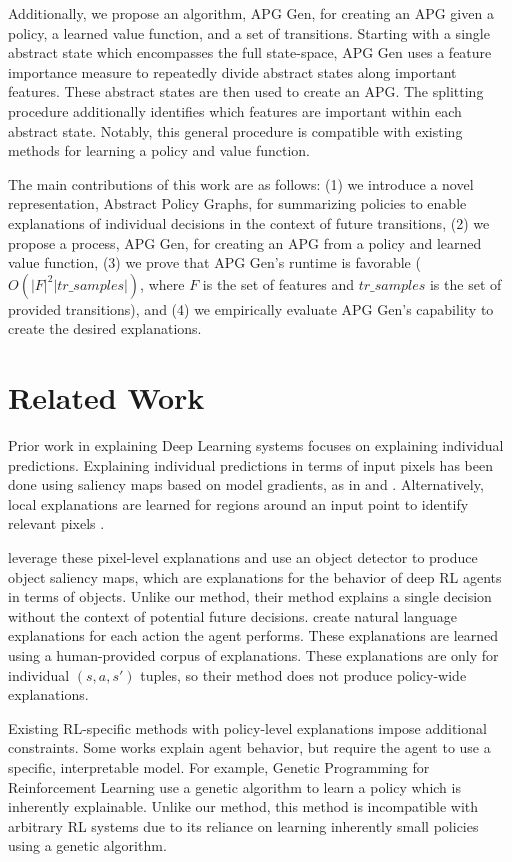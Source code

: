 \documentclass[letterpaper]{article} %
\begin{document}
Additionally, we propose an algorithm, APG Gen, for creating an APG given a policy, a learned value function, and a set of transitions. 
Starting with a single abstract state which encompasses the full state-space, APG Gen uses a feature importance measure to repeatedly divide abstract states along important features. 
These abstract states are then used to create an APG. 
The splitting procedure additionally identifies which features are important within each abstract state. 
Notably, this general procedure is compatible with existing methods for learning a policy and value function.

The main contributions of this work are as follows: (1) we introduce a novel representation, Abstract Policy Graphs, for summarizing policies to enable explanations of individual decisions in the context of future transitions, (2) we propose a process, APG Gen, for creating an APG from a policy and learned value function, (3) we prove that APG Gen's runtime is favorable ($O(|F|^2 |tr\_samples|)$, where $F$ is the set of features and $tr\_samples$ is the set of provided transitions), 
and (4) we empirically evaluate APG Gen's capability to create the desired explanations.

\section{Related Work}
Prior work in explaining Deep Learning systems focuses on explaining individual predictions. 
Explaining individual predictions in terms of input pixels has been done using saliency maps based on model gradients, as in \cite{image_FI_13} and \cite{image_FI_samek}. 
Alternatively, local explanations are learned for regions around an input point to identify relevant pixels \cite{image_FI_dog}. 

\cite{katia} leverage these pixel-level explanations and use an object detector to produce object saliency maps, which are explanations for the behavior of deep RL agents in terms of objects. 
Unlike our method, their method explains a single decision without the context of potential future decisions. 
\cite{frogger} create natural language explanations for each action the agent performs. 
These explanations are learned using a human-provided corpus of explanations. 
These explanations are only for individual $(s,a,s')$ tuples, so their method does not produce policy-wide explanations.

Existing RL-specific methods with policy-level explanations impose additional constraints. 
Some works explain agent behavior, but require the agent to use a specific, interpretable model. 
For example, Genetic Programming for Reinforcement Learning \cite{genetic} use a genetic algorithm to learn a policy which is inherently explainable. 
Unlike our method, this method is incompatible with arbitrary RL systems due to its reliance on learning inherently small policies using a genetic algorithm. 
\end{document}
